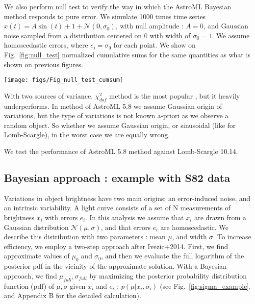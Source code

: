 \documentclass[fleqn,usenatbib]{mnras}  %
\begin{document}
We also perform null test to verify the way in which the AstroML Bayesian method responds to pure error.  We simulate 1000 times time series  $x(t) = A \sin{(t)}+1+\mathcal{N}(0,\sigma_{0})$, with  null amplitude : $A =0$, and Gaussian noise sampled from a distribution centered on 0 with width  of  $\sigma_{0} = 1$. We assume homoscedastic errors,  where $e_{i} =\sigma_{0} $ for each point. We show on Fig.~\ref{fig:null_test}  normalized cumulative sums for the same quantities as what is shown on previous figures. 


\begin{figure*}
 \texttt{[image: figs/Fig\_null\_test\_cumsum]}
  \caption{A sanity check: setting A=0, we  perform  1000 realizations of harmonic time series with Gaussian unit noise  (as Figs.~\ref{fig:chi2_and_SN},\ref{fig:completeness_curve},\ref{fig:chi_sn_scatter},\ref{fig:A_vs_chi2},\ref{fig:A_vs_SN},\ref{fig:A_vs_sigma}). From left to right,panels show cumulative sums of $\chi^{2}_{DOF}$, S/N ratio ( = $\hat \sigma$ / $st.dev.[p(\sigma)]$  per iteration), the mean $\sigma$  ($\hat \sigma$), $\sigma(L^{0})$ : $\sigma$ at the 2-D maximum of the full log-likelihood. [more info : why do these plots make sense ? ]}
\label{fig:null_test}
\end{figure*}




With two sources of variance, $\chi^{2}_{dof} $ method is the  most popular , but it heavily underperforms. In method of AstroML 5.8 we assume Gaussian origin of variations, but the type of variations is not known a-priori as we observe a random object. So whether we assume Gaussian origin, or sinusoidal (like for Lomb-Scargle), in the worst case we are equally wrong. 

We test the performance of AstroML 5.8 method against Lomb-Scargle 10.14. 


\subsection{Bayesian approach : example with S82 data }

Variations in object brightness  have two main origins:  an  error-induced noise, and an intrinsic variability. A light curve consists of a set of N measurements of brightness  $x_{i}$  with  errors  $e_{i}$. In this analysis we assume that  $x_{i}$ are drawn from a Gaussian distribution  $\mathcal{N}(\mu,\sigma)$, and that errors $e_{i}$ are homoscedastic. We describe this distribution with two parameters : mean $\mu$, and width $\sigma$. To increase efficiency, we employ a two-step  approach after Ivezic+2014. 
First, we find approximate values of  $\mu_{0}$ and $\sigma_{0}$, and then we evaluate the full logarithm of the posterior pdf in the vicinity of the approximate solution.
With a Bayesian approach, we find $\mu_{full},\sigma_{full}$  by maximizing  the posterior probability distribution function (pdf) of  $\mu,\sigma$ given $x_{i}$ and $e_{i}$ : $p(\mu | {x_{i}},{\sigma_{i}})$ (see Fig.~\ref{fig:sigma_example}, and Appendix B for the detailed calculation). 
\end{document}
